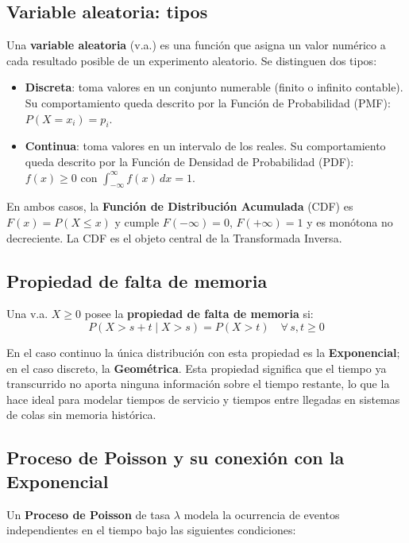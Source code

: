\documentclass[a4paper, 11pt]{article}
\begin{document}
\subsection{Variable aleatoria: tipos}

Una \textbf{variable aleatoria} (v.a.) es una función que asigna un valor numérico a cada
resultado posible de un experimento aleatorio. Se distinguen dos tipos:

\begin{itemize}
    \item \textbf{Discreta}: toma valores en un conjunto numerable
          (finito o infinito contable). Su comportamiento queda descrito por la
          Función de Probabilidad (PMF): $P(X = x_i) = p_i$.
    \item \textbf{Continua}: toma valores en un intervalo de los reales.
          Su comportamiento queda descrito por la Función de Densidad de
          Probabilidad (PDF): $f(x) \geq 0$ con $\int_{-\infty}^{\infty} f(x)\,dx = 1$.
\end{itemize}

En ambos casos, la \textbf{Función de Distribución Acumulada} (CDF) es
$F(x) = P(X \leq x)$ y cumple $F(-\infty)=0$, $F(+\infty)=1$ y es monótona no
decreciente. La CDF es el objeto central de la Transformada Inversa.

\subsection{Propiedad de falta de memoria}

Una v.a. $X \geq 0$ posee la \textbf{propiedad de falta de memoria} si:
\begin{equation}
P(X > s + t \mid X > s) = P(X > t) \quad \forall\, s, t \geq 0
\end{equation}

En el caso continuo la única distribución con esta propiedad es la
\textbf{Exponencial}; en el caso discreto, la \textbf{Geométrica}. Esta propiedad
significa que el tiempo ya transcurrido no aporta ninguna información sobre el tiempo
restante, lo que la hace ideal para modelar tiempos de servicio y tiempos entre llegadas
en sistemas de colas sin memoria histórica.

\subsection{Proceso de Poisson y su conexión con la Exponencial}

Un \textbf{Proceso de Poisson} de tasa $\lambda$ modela la ocurrencia de eventos
independientes en el tiempo bajo las siguientes condiciones:
\end{document}
